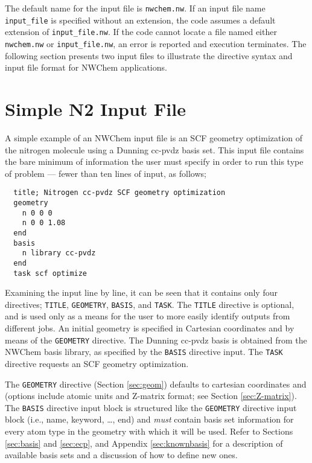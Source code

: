 The default name for the input file is \verb+nwchem.nw+.  If an input
file name \verb+input_file+ is specified without an extension, the code
assumes a default extension of \verb+input_file.nw+.  If the code cannot
locate a file named either \verb+nwchem.nw+ or \verb+input_file.nw+, an 
error is reported and execution terminates.  The following
section presents two input files to illustrate the directive syntax and 
input file format for NWChem applications.

\section{Simple N2 Input File}
\label{sec:simplesample}

A simple example of an NWChem input file is an SCF geometry optimization of
the nitrogen molecule using a Dunning cc-pvdz basis set.  This input
file contains the bare minimum of information the user must specify in
order to run this type of problem --- fewer than ten lines of input,
as follows;
\begin{verbatim}
  title; Nitrogen cc-pvdz SCF geometry optimization
  geometry  
    n 0 0 0
    n 0 0 1.08
  end
  basis
    n library cc-pvdz
  end
  task scf optimize
\end{verbatim}

Examining the input line by line, it can be seen that it contains
only four directives; \verb+TITLE+, \verb+GEOMETRY+, \verb+BASIS+, and
\verb+TASK+.  The \verb+TITLE+ directive is optional, and is used only
as a means for the user to more easily identify outputs from different
jobs.  An initial geometry is specified in Cartesian coordinates and
{\angstroms} by means of the \verb+GEOMETRY+ directive.  The Dunning 
cc-pvdz basis is obtained from the NWChem basis library, as specified
by the \verb+BASIS+ directive input.  The \verb+TASK+ directive requests 
an SCF geometry optimization.

The \verb+GEOMETRY+ directive (Section \ref{sec:geom}) defaults to cartesian
coordinates and {\angstroms} (options include atomic units and
Z-matrix format; see Section \ref{sec:Z-matrix}).  The \verb+BASIS+ 
directive input block is structured like the \verb+GEOMETRY+ directive
input block (i.e., name,
keyword, \ldots, end) and {\em must} contain basis set information for
every atom type in the geometry with which it will be used.
Refer to Sections \ref{sec:basis} and \ref{sec:ecp}, and Appendix
\ref{sec:knownbasis} for a description of available basis sets and a
discussion of how to define new ones.

